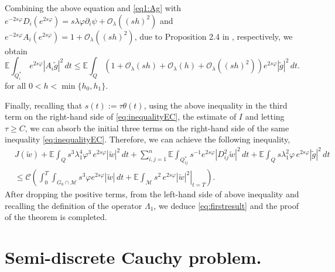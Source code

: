 \documentclass[11pt,oneside,leqno]{amsart}
\numberwithin{equation}{section}
\numberwithin{equation}{section}
\newcommand{\E}{\mathbb{E}}
\begin{document}
Combining the above equation and \eqref{eq1:Ag} with $e^{-2s\varphi}D_i(e^{2s\varphi})=s\lambda\varphi\partial_i\psi+\mathcal{O}_{\lambda}((sh)^2)$ and $e^{-2s\varphi}A_i(e^{2s\varphi}) = 1 + \mathcal{O}_{\lambda}((sh)^2)$, due to Proposition 2.4 in \cite{AA:perez:2024}, respectively, we obtain
\begin{equation*}
\E\int_{Q_i^{\ast}}\,e^{2s\varphi}|A_i\tilde{g}|^2\,dt \leq \E\int_{Q}\left(1+\mathcal{O}_{\lambda}(sh)+\mathcal{O}_{\lambda}(h) + \mathcal{O}_{\lambda}((sh)^2)\right)e^{2s\varphi}|\tilde{g}|^2\,dt.
\end{equation*}
for all $0<h<\min\{h_0,h_{1}\}$.

Finally, recalling that $s(t):=\tau\theta(t)$, using the above inequality in the third term on the right-hand side of \eqref{eq:inequalityEC}, the estimate of $I$ and letting $\tau \geq C$, we can absorb the initial three terms on the right-hand side of the same inequality \eqref{eq:inequalityEC}. Therefore, we can achieve the following inequality,
{ 
\begin{equation*}
\begin{split}
&J(\tilde{w}) + \E\int_{Q}s^{3}\lambda^{4}_{1}\varphi^{3}\,e^{2s\varphi}|\tilde{w}|^{2}\,dt +{ \sum_{i,j=1}^{n}}\E\int_{Q_{ij}^{\ast}}s^{-1}e^{2s\varphi}|D_{ij}^2\tilde{w}|^2\, dt + \E\int_{Q}s\lambda_{1}^2\varphi\,e^{2s\varphi}|\tilde{g}|^2\,dt \\
&\leq \mathcal{C}\left(\int_{0}^T\int_{G_0\cap\mathcal{M}}s^3\varphi e^{2s\varphi}|\tilde{w}|\,dt + \left.\E\int_{\mathcal{M}}s^2\,e^{2s\varphi}|\tilde{w}|^2\right|_{t=T}\right).
\end{split}
\end{equation*}
}
After dropping the positive terms, from the left-hand side of above inequality and recalling the definition of the operator $\Lambda_1$, we deduce \eqref{eq:firstresult} and the proof of the theorem is completed.

\section{Semi-discrete Cauchy problem.}\label{sec:cauchyproblem}
\end{document}
